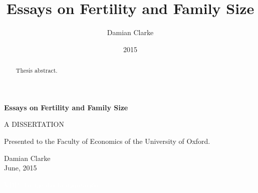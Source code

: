 \documentclass{report}[12pt]
\title{\textbf{Essays on Fertility and Family Size}}
\author{Damian Clarke}
\date{2015}
\begin{document}

\vspace*{\fill}
\vspace{-5cm}
\begin{center}
{\LARGE \textbf{Essays on Fertility and Family Size}}
\end{center}
\vspace*{\fill}

\newpage
\begin{center}
A DISSERTATION \\ \vspace{1cm}

Presented to the Faculty of Economics of the University of Oxford.

\vspace{17cm}
Damian Clarke \\ \vspace{1mm}
June, 2015
\end{center}



\newpage
\begin{spacing}{1.4}
\begin{center}
\pagestyle{empty}
\textcolor{white}{VBP: T\'u me das la inspiraci\'on}\\
\vspace{5cm}
\end{center}
\end{spacing}
\newpage

\begin{abstract}
Thesis abstract.
\vspace{14cm}
\end{abstract}

\newpage
\tableofcontents
{}
\end{document}
